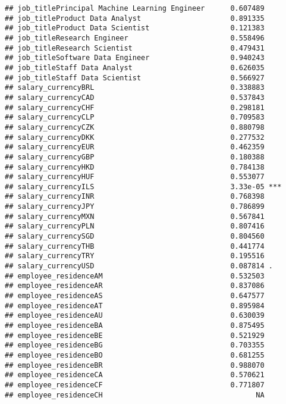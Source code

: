 \documentclass[
]{article}
\begin{document}
\begin{verbatim}
## job_titlePrincipal Machine Learning Engineer      0.607489    
## job_titleProduct Data Analyst                     0.891335    
## job_titleProduct Data Scientist                   0.121383    
## job_titleResearch Engineer                        0.558496    
## job_titleResearch Scientist                       0.479431    
## job_titleSoftware Data Engineer                   0.940243    
## job_titleStaff Data Analyst                       0.626035    
## job_titleStaff Data Scientist                     0.566927    
## salary_currencyBRL                                0.338883    
## salary_currencyCAD                                0.537843    
## salary_currencyCHF                                0.298181    
## salary_currencyCLP                                0.709583    
## salary_currencyCZK                                0.880798    
## salary_currencyDKK                                0.277532    
## salary_currencyEUR                                0.462359    
## salary_currencyGBP                                0.180388    
## salary_currencyHKD                                0.784138    
## salary_currencyHUF                                0.553077    
## salary_currencyILS                                3.33e-05 ***
## salary_currencyINR                                0.768398    
## salary_currencyJPY                                0.786899    
## salary_currencyMXN                                0.567841    
## salary_currencyPLN                                0.807416    
## salary_currencySGD                                0.804560    
## salary_currencyTHB                                0.441774    
## salary_currencyTRY                                0.195516    
## salary_currencyUSD                                0.087814 .  
## employee_residenceAM                              0.532503    
## employee_residenceAR                              0.837086    
## employee_residenceAS                              0.647577    
## employee_residenceAT                              0.895984    
## employee_residenceAU                              0.630039    
## employee_residenceBA                              0.875495    
## employee_residenceBE                              0.521929    
## employee_residenceBG                              0.703355    
## employee_residenceBO                              0.681255    
## employee_residenceBR                              0.988070    
## employee_residenceCA                              0.570621    
## employee_residenceCF                              0.771807    
## employee_residenceCH                                    NA    

\end{verbatim}
\end{document}
